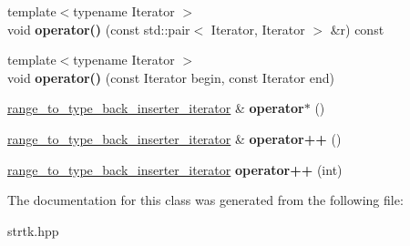 \begin{DoxyCompactItemize}
\item 
\hypertarget{classstrtk_1_1range__to__type__back__inserter__iterator_a6d38f9a9da571f42b83b7781615d8c77}{{\footnotesize template$<$typename Iterator $>$ }\\void {\bfseries operator()} (const std\-::pair$<$ Iterator, Iterator $>$ \&r) const }\label{classstrtk_1_1range__to__type__back__inserter__iterator_a6d38f9a9da571f42b83b7781615d8c77}

\item 
\hypertarget{classstrtk_1_1range__to__type__back__inserter__iterator_a958ac2dd68e0970fb984eb9beca3cd57}{{\footnotesize template$<$typename Iterator $>$ }\\void {\bfseries operator()} (const Iterator begin, const Iterator end)}\label{classstrtk_1_1range__to__type__back__inserter__iterator_a958ac2dd68e0970fb984eb9beca3cd57}

\item 
\hypertarget{classstrtk_1_1range__to__type__back__inserter__iterator_a15d28d30e968840abad54afd699849bc}{\hyperlink{classstrtk_1_1range__to__type__back__inserter__iterator}{range\-\_\-to\-\_\-type\-\_\-back\-\_\-inserter\-\_\-iterator} \& {\bfseries operator$\ast$} ()}\label{classstrtk_1_1range__to__type__back__inserter__iterator_a15d28d30e968840abad54afd699849bc}

\item 
\hypertarget{classstrtk_1_1range__to__type__back__inserter__iterator_ad198752ea500bf932039af509d4e733c}{\hyperlink{classstrtk_1_1range__to__type__back__inserter__iterator}{range\-\_\-to\-\_\-type\-\_\-back\-\_\-inserter\-\_\-iterator} \& {\bfseries operator++} ()}\label{classstrtk_1_1range__to__type__back__inserter__iterator_ad198752ea500bf932039af509d4e733c}

\item 
\hypertarget{classstrtk_1_1range__to__type__back__inserter__iterator_a50e260507ec04740cfdec09acdac6400}{\hyperlink{classstrtk_1_1range__to__type__back__inserter__iterator}{range\-\_\-to\-\_\-type\-\_\-back\-\_\-inserter\-\_\-iterator} {\bfseries operator++} (int)}\label{classstrtk_1_1range__to__type__back__inserter__iterator_a50e260507ec04740cfdec09acdac6400}

\end{DoxyCompactItemize}


The documentation for this class was generated from the following file\-:\begin{DoxyCompactItemize}
\item 
strtk.\-hpp\end{DoxyCompactItemize}
